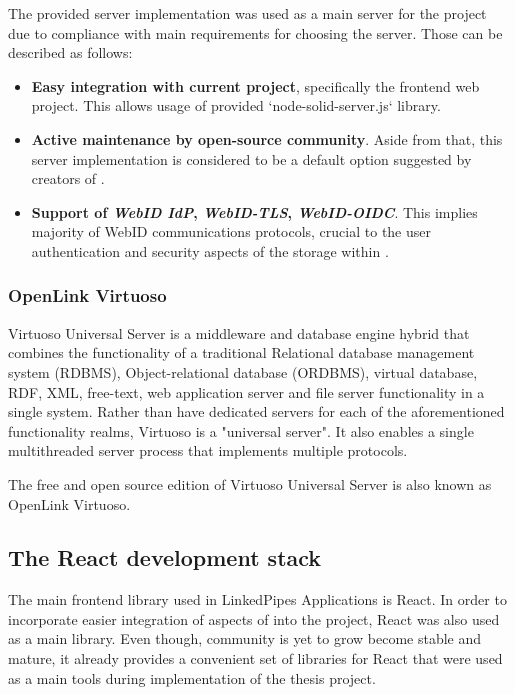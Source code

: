 The provided server implementation was used as a main \solid{} server for the project due to compliance with main requirements for choosing the server. Those can be described as follows:
\begin{itemize}
	\item \textbf{Easy integration with current \lpa{} project}, specifically the frontend web project. This allows usage of provided `node-solid-server.js` library.
    \item \textbf{Active maintenance by open-source community}. Aside from that, this server implementation is considered to be a default option suggested by creators of \solid{}.
    \item \textbf{Support of \textit{WebID IdP}, \textit{WebID-TLS}, \textit{WebID-OIDC}}. This implies majority of WebID communications protocols,
    crucial to the user authentication and security aspects of the storage within \lpa{}.
\end{itemize}

\subsubsection{OpenLink Virtuoso}

Virtuoso Universal Server is a middleware and database engine hybrid that combines the functionality of a traditional Relational database management system (RDBMS), Object-relational database (ORDBMS), virtual database, RDF, XML, free-text, web application server and file server functionality in a single system. Rather than have dedicated servers for each of the aforementioned functionality realms, Virtuoso is a "universal server". It also enables a single multithreaded server process that implements multiple protocols.

The free and open source edition of Virtuoso Universal Server is also known as OpenLink Virtuoso.

\subsection{The \solid{} React development stack}

The main frontend library used in LinkedPipes Applications is React. In order to incorporate easier integration of aspects of \solid{} into the project, React was also used as a main library. Even though, \solid{} community is yet to grow become stable and mature, it already provides a convenient set of libraries for React that were used as a main tools during implementation of the thesis project. 

